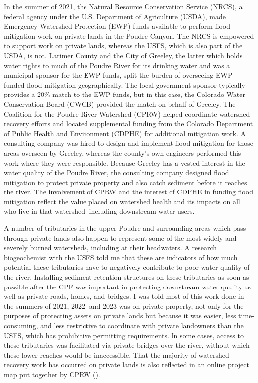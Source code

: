 \documentclass[
]{article}
\begin{document}
In the summer of 2021, the Natural Resource Conservation Service (NRCS), a federal agency under the U.S. Department of Agriculture (USDA), made Emergency Watershed Protection (EWP) funds available to perform flood mitigation work on private lands in the Poudre Canyon. The NRCS is empowered to support work on private lands, whereas the USFS, which is also part of the USDA, is not. Larimer County and the City of Greeley, the latter which holds water rights to much of the Poudre River for its drinking water and was a municipal sponsor for the EWP funds, split the burden of overseeing EWP-funded flood mitigation geographically. The local government sponsor typically provides a 20\% match to the EWP funds, but in this case, the Colorado Water Conservation Board (CWCB) provided the match on behalf of Greeley. The Coalition for the Poudre River Watershed (CPRW) helped coordinate watershed recovery efforts and located supplemental funding from the Colorado Department of Public Health and Environment (CDPHE) for additional mitigation work. A consulting company was hired to design and implement flood mitigation for those areas overseen by Greeley, whereas the county's own engineers performed this work where they were responsible. Because Greeley has a vested interest in the water quality of the Poudre River, the consulting company designed flood mitigation to protect private property and also catch sediment before it reaches the river. The involvement of CPRW and the interest of CDPHE in funding flood mitigation reflect the value placed on watershed health and its impacts on all who live in that watershed, including downstream water users.

A number of tributaries in the upper Poudre and surrounding areas which pass through private lands also happen to represent some of the most widely and severely burned watersheds, including at their headwaters. A research biogeochemist with the USFS told me that these are indicators of how much potential these tributaries have to negatively contribute to poor water quality of the river. Installing sediment retention structures on these tributaries as soon as possible after the CPF was important in protecting downstream water quality as well as private roads, homes, and bridges. I was told most of this work done in the summers of 2021, 2022, and 2023 was on private property, not only for the purposes of protecting assets on private lands but because it was easier, less time-consuming, and less restrictive to coordinate with private landowners than the USFS, which has prohibitive permitting requirements. In some cases, access to these tributaries was facilitated via private bridges over the river, without which these lower reaches would be inaccessible. That the majority of watershed recovery work has occurred on private lands is also reflected in an online project map put together by CPRW ().
\end{document}
